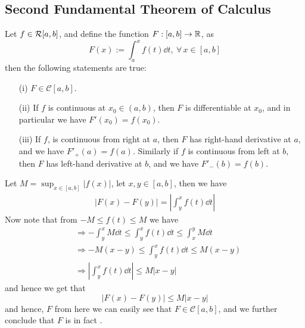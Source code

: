 \subsection{Second Fundamental Theorem of Calculus}

\begin{thm}
    Let $f \in \mathcal{R}[a,b]$, and define the function $F : [a,b] \to \mathbb{R}$, as 
    \begin{equation}\label{eq2:feb14}
        F(x) := \int_a^x f(t) \dd{t}, \ \forall \, x \in [a,b]
    \end{equation}
    then the following statements are true:
    \begin{enumerate}
        \item[(i)] $F \in \mathcal{C}[a,b]$.
        \item[(ii)] If $f$ is continuous at $x_0 \in (a,b)$, then $F$ is differentiable at $x_0$, and in particular we have $F'(x_0) = f(x_0)$.
        \item[(iii)] If $f$, is continuous from right at $a$, then $F$ has right-hand derivative at $a$, and we have $F'_{+}(a) = f(a)$. Similarly if $f$ is continuous from left at $b$, then $F$ has left-hand derivative at $b$, and we have $F'_{-}(b) = f(b)$. 
    \end{enumerate}
\end{thm}

\begin{prf}
    Let $M = \sup_{x \in [a,b]} |f(x)|$, let $x,y \in [a,b]$, then we have 
    \begin{align*}
        |F(x) - F(y)| = \left| \int_y^x f(t) \dd{t} \right| 
    \end{align*}
    Now note that from $-M \leq f(t) \leq M $ we have 
    \begin{align*} 
        &\Rightarrow -\int_y^x M \dd{t} \leq \int_y^x f(t) \dd{t} \leq \int_x^y M \dd{t} \\ 
        &\Rightarrow -M(x-y) \leq \int_y^x f(t) \dd{t} \leq M(x-y) \\ 
        &\Rightarrow \left| \int_y^x f(t) \dd{t} \right| \leq M |x-y|
    \end{align*}
    and hence we get that 
    \[
        |F(x) - F(y)| \leq M |x-y|  
    \]
    and hence, $F$ from here we can easily see that $F \in \mathcal{C}[a,b]$, and we further conclude that $F$ is in fact .
\end{prf} 